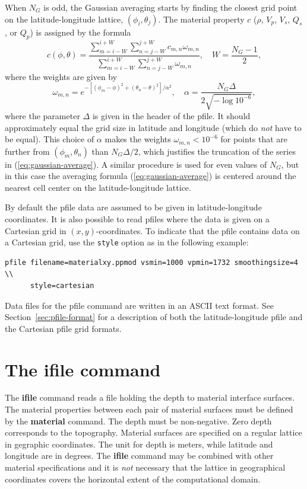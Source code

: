 \documentclass[11pt]{report}
\begin{document}
When $N_G$ is odd, the Gaussian averaging starts by finding the closest grid point on the
latitude-longitude lattice, $(\phi_i,\theta_j)$. The material property $c$ ($\rho$, $V_p$, $V_s$,
$Q_s$, or $Q_p$) is assigned by the formula
\begin{equation}\label{eq:gaussian-average}
c(\phi,\theta) = \dfrac{ \sum_{m=i-W}^{i+W} \sum_{n=j-W}^{j+W} c_{m,n} \omega_{m,n} }
{ \sum_{m=i-W}^{i+W} \sum_{n=j-W}^{j+W} \omega_{m,n} },\quad W = \frac{N_G-1}{2},
\end{equation}
where the weights are given by
\[
\omega_{m,n} = e^{-[(\phi_m-\phi)^2 + (\theta_n-\theta)^2]/\alpha^2},\quad \alpha = \frac{N_G \Delta}{2
  \sqrt{-\log 10^{-6}}},
\]
where the parameter $\Delta$ is given in the header of the pfile. It should approximately equal the
grid size in latitude and longitude (which do {\em not} have to be equal). This choice of $\alpha$ makes
the weights $\omega_{m,n}<10^{-6}$ for points that are further from $(\phi_m, \theta_n)$ than $N_G
\Delta/2$, which justifies the truncation of the series in (\ref{eq:gaussian-average}). A
similar procedure is used for even values of $N_G$, but in this case the averaging formula
(\ref{eq:gaussian-average}) is centered around the nearest cell center on the latitude-longitude
lattice.

By default the pfile data are assumed to be given in latitude-longitude coordinates. It is also
possible to read pfiles where the data is given on a Cartesian grid in $(x, y)$-coordinates. To
indicate that the pfile contains data on a  Cartesian grid, use the {\tt style}
option as in the following example:
\begin{verbatim}
pfile filename=materialxy.ppmod vsmin=1000 vpmin=1732 smoothingsize=4 \\
      style=cartesian
\end{verbatim}

Data files for the pfile command are written in an ASCII text format. See
Section~\ref{sec:pfile-format} for a description of both the latitude-longitude pfile and the
Cartesian pfile grid formats.

\section{The ifile command}\label{sec:ifile}
The {\bf ifile} command reads a file holding the depth to material interface surfaces. The material
properties between each pair of material surfaces must be defined by the {\bf material} command. The
depth must be non-negative. Zero depth corresponds to the topography. Material surfaces are
specified on a regular lattice in gegraphic coordinates. The unit for depth is meters, while
latitude and longitude are in degrees. The {\bf ifile} command may be combined with other material
specifications and it is {\em not} necessary that the lattice in geographical coordinates covers the
horizontal extent of the computational domain.
\end{document}
